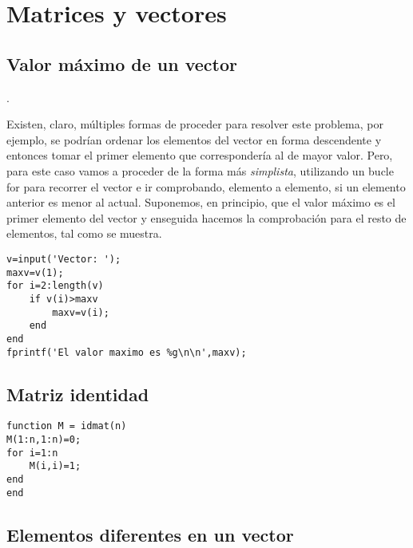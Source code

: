 \chapter{Matrices y vectores}

\section{Valor máximo de un vector}

.

\sol

Existen, claro, múltiples formas de proceder para resolver este problema, por ejemplo, se podrían 
ordenar los elementos del vector en forma descendente y entonces tomar el primer elemento que 
correspondería al de mayor valor. Pero, para este caso vamos a proceder de la forma más \textit{simplista}, 
utilizando un bucle for para recorrer el vector e ir comprobando, elemento a elemento, si un elemento 
anterior es menor al actual. Suponemos, en principio, que el valor máximo es el primer elemento del vector 
y enseguida hacemos la comprobación para el resto de elementos, tal como se muestra.

\begin{verbatim}
v=input('Vector: ');
maxv=v(1);
for i=2:length(v)
    if v(i)>maxv
        maxv=v(i);
    end
end
fprintf('El valor maximo es %g\n\n',maxv);
\end{verbatim}

\section{Matriz identidad}


\sol

\begin{verbatim}
function M = idmat(n)
M(1:n,1:n)=0;
for i=1:n
    M(i,i)=1;
end
end
\end{verbatim}


\section{Elementos diferentes en un vector}

